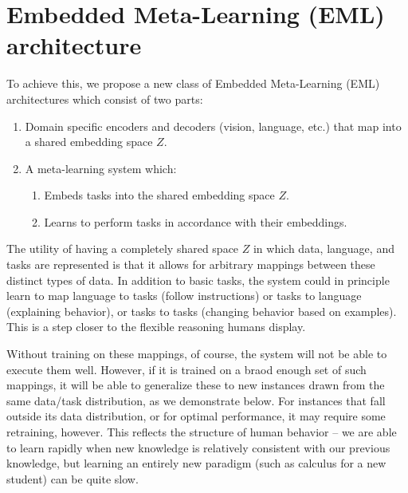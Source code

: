 \documentclass{article}
\begin{document}
\section{Embedded Meta-Learning (EML) architecture}
To achieve this, we propose a new class of Embedded Meta-Learning (EML) architectures which consist of two parts: 
\begin{enumerate}
\item Domain specific encoders and decoders (vision, language, etc.) that map into a shared embedding space $Z$.
\item A meta-learning system which:
    \begin{enumerate}
    \item Embeds tasks into the shared embedding space $Z$.
    \item Learns to perform tasks in accordance with their embeddings.
    \end{enumerate}
\end{enumerate}
The utility of having a completely shared space $Z$ in which data, language, and tasks are represented is that it allows for arbitrary mappings between these distinct types of data. In addition to basic tasks, the system could in principle learn to map language to tasks (follow instructions) or tasks to language (explaining behavior), or tasks to tasks (changing behavior based on examples). This is a step closer to the flexible reasoning humans display. \par
Without training on these mappings, of course, the system will not be able to execute them well. However, if it is trained on a braod enough set of such mappings, it will be able to generalize these to new instances drawn from the same data/task distribution, as we demonstrate below. For instances that fall outside its data distribution, or for optimal performance, it may require some retraining, however. This reflects the structure of human behavior -- we are able to learn rapidly when new knowledge is relatively consistent with our previous knowledge, but learning an entirely new paradigm (such as calculus for a new student) can be quite slow. \par 
\end{document}
